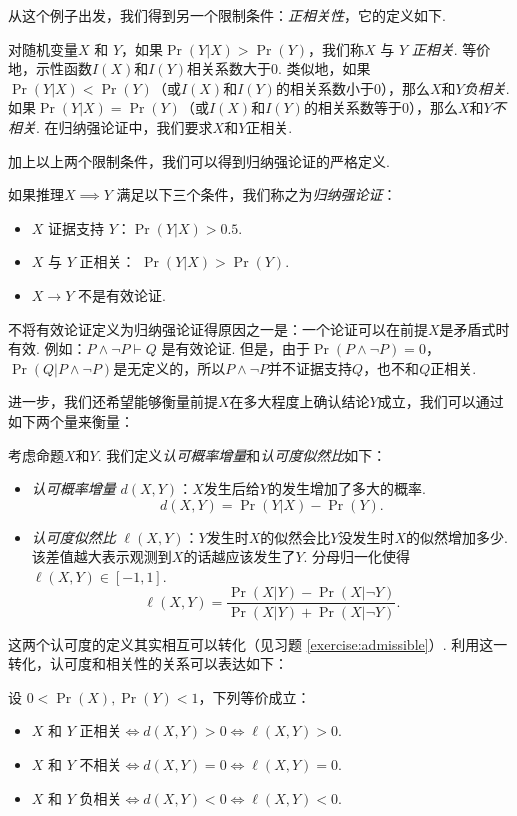 从这个例子出发，我们得到另一个限制条件：\textit{正相关性}，它的定义如下. 

\begin{definition}[相关性]
    对随机变量$X$ 和 $Y$，如果$\Pr(Y|X) > \Pr(Y)$，我们称$X$ 与 $Y$ \textit{正相关}. 等价地，示性函数$I(X)$和$I(Y)$相关系数大于$0$. 类似地，如果$\Pr(Y|X) < \Pr(Y)$（或$I(X)$和$I(Y)$的相关系数小于$0$），那么$X$和$Y$\textit{负相关}. 如果$\Pr(Y|X) = \Pr(Y)$（或$I(X)$和$I(Y)$的相关系数等于$0$），那么$X$和$Y$\textit{不相关}. 在归纳强论证中，我们要求$X$和$Y$正相关.
\end{definition}

加上以上两个限制条件，我们可以得到归纳强论证的严格定义.

\begin{definition}[归纳强论证]
    如果推理$X \implies Y$ 满足以下三个条件，我们称之为\textit{归纳强论证}：
	\begin{itemize}
	\item $X$ 证据支持 $Y$：$\Pr(Y|X)>0.5$.
	\item $X$ 与 $Y$ 正相关： $\Pr(Y|X) > \Pr(Y)$. 
	\item $X\rightarrow Y$ 不是有效论证.
	\end{itemize}
\end{definition}

不将有效论证定义为归纳强论证得原因之一是：一个论证可以在前提$X$是矛盾式时有效. 例如：$P \wedge \neg P \vdash Q$ 是有效论证. 但是，由于$\Pr(P \wedge \neg P) = 0$，$\Pr(Q | P \wedge \neg P)$是无定义的，所以$P \wedge \neg P$并不证据支持$Q$，也不和$Q$正相关.

进一步，我们还希望能够衡量前提$X$在多大程度上确认结论$Y$成立，我们可以通过如下两个量来衡量：
\begin{definition}[认可度]
考虑命题$X$和$Y$. 我们定义\textit{认可概率增量}和\textit{认可度似然比}如下：
\begin{itemize}
\item \textit{认可概率增量} $d(X, Y)$：$X$发生后给$Y$的发生增加了多大的概率.
\[
    d(X, Y) = \Pr(Y|X) - \Pr(Y).
\]
\item \textit{认可度似然比} $\ell(X, Y)$：$Y$发生时$X$的似然会比$Y$没发生时$X$的似然增加多少. 该差值越大表示观测到$X$的话越应该发生了$Y$. 分母归一化使得$\ell(X,Y)\in[-1,1]$.
\[
    \ell(X, Y) = \frac{\Pr(X|Y) - \Pr(X|\neg Y)}{\Pr(X|Y) + \Pr(X|\neg Y)}.
\]
\end{itemize} 
\end{definition}

这两个认可度的定义其实相互可以转化（见习题 \ref{exercise:admissible}）. 利用这一转化，认可度和相关性的关系可以表达如下：
\begin{proposition}
    设 $0< \Pr(X),\Pr(Y) < 1$，下列等价成立：
    \begin{itemize}
        \item $X$ 和 $Y$ 正相关$\iff d(X,Y) > 0\iff \ell(X, Y) > 0$.
        \item $X$ 和 $Y$ 不相关$\iff d(X, Y) = 0\iff \ell(X, Y) = 0$. 
        \item $X$ 和 $Y$ 负相关$\iff d(X,Y) < 0\iff\ell(X, Y) < 0$.
    \end{itemize}    
\end{proposition}

